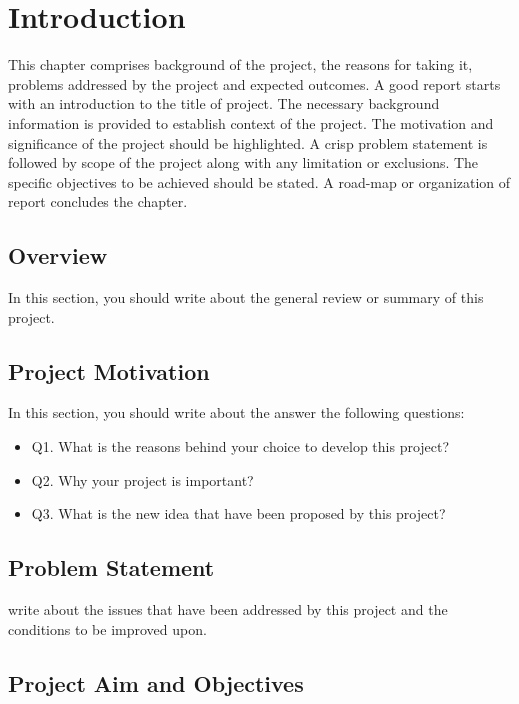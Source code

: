 \chapter{Introduction}

This chapter comprises background of the project, the reasons for taking it, problems addressed by the project and expected outcomes. A good report starts with an introduction to the title of project. The necessary background information is provided to establish context of the project. The motivation and significance of the project should be highlighted. A crisp problem statement is followed by scope of the project along with any limitation or exclusions. The specific objectives to be achieved should be stated. A road-map or organization of report concludes the chapter.

\section{Overview}

In this section, you should write about the general review or summary of this project.

\section{Project Motivation}

In this section, you should write about the answer the following questions:

\begin{itemize}
\item Q1. What is the reasons behind your choice to develop this project?
\item Q2. Why your project is important?
\item Q3. What is the new idea that have been proposed by this project?
\end{itemize}


\section{Problem Statement}

write about the issues that have been addressed by this project and the conditions to be improved upon.

\section{Project Aim and Objectives}

